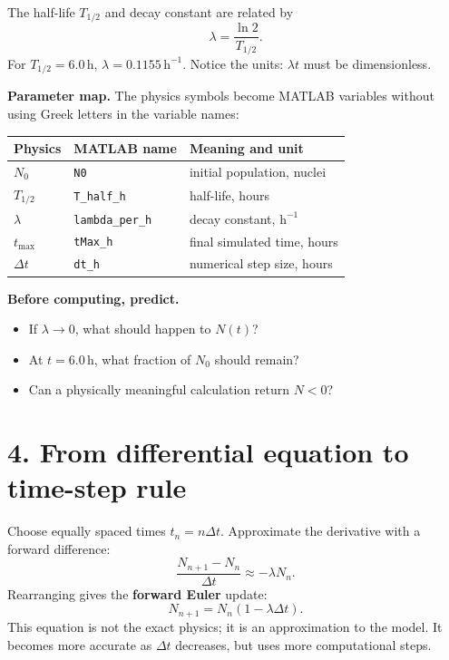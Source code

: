 \documentclass[11pt,a4paper]{article}
\begin{document}
The half-life $T_{1/2}$ and decay constant are related by
\begin{equation}
  \lambda = \frac{\ln 2}{T_{1/2}}.
\end{equation}
For $T_{1/2}=6.0\,\mathrm{h}$, $\lambda=0.1155\,\mathrm{h}^{-1}$. Notice the units: $\lambda t$ must be dimensionless.

\textbf{Parameter map.} The physics symbols become MATLAB variables without using Greek letters in the variable names:
\begin{center}
\small
\begin{tabular}{>{\raggedright\arraybackslash}p{.22\linewidth}p{.29\linewidth}p{.34\linewidth}}
\toprule
\textbf{Physics} & \textbf{MATLAB name} & \textbf{Meaning and unit}\\ \midrule
$N_0$ & \texttt{N0} & initial population, nuclei\\
$T_{1/2}$ & \texttt{T\_half\_h} & half-life, hours\\
$\lambda$ & \texttt{lambda\_per\_h} & decay constant, $\mathrm{h}^{-1}$\\
$t_{\max}$ & \texttt{tMax\_h} & final simulated time, hours\\
$\Delta t$ & \texttt{dt\_h} & numerical step size, hours\\ \bottomrule
\end{tabular}
\end{center}

\begin{checkbox}
\textbf{Before computing, predict.}
\begin{itemize}[nosep,leftmargin=5mm]
  \item If $\lambda\to0$, what should happen to $N(t)$?
  \item At $t=6.0\,\mathrm{h}$, what fraction of $N_0$ should remain?
  \item Can a physically meaningful calculation return $N<0$?
\end{itemize}
\end{checkbox}

\section*{4. From differential equation to time-step rule}
Choose equally spaced times $t_n=n\Delta t$. Approximate the derivative with a forward difference:
\begin{equation}
  \frac{N_{n+1}-N_n}{\Delta t}\approx-\lambda N_n.
\end{equation}
Rearranging gives the \textbf{forward Euler} update:
\begin{equation}
  N_{n+1}=N_n\left(1-\lambda\Delta t\right).
\end{equation}
This equation is not the exact physics; it is an approximation to the model. It becomes more accurate as $\Delta t$ decreases, but uses more computational steps.
\end{document}
